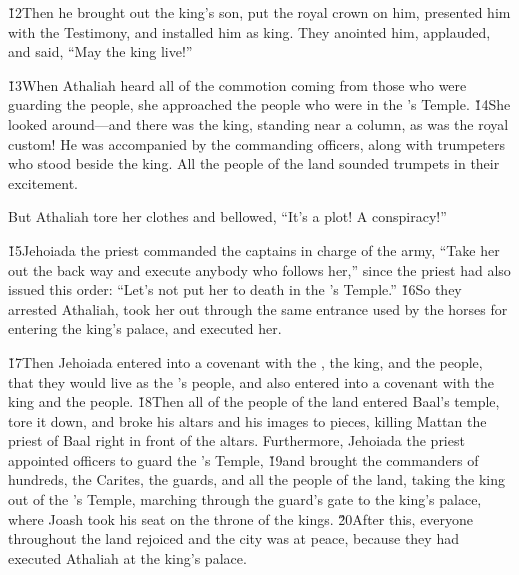 \v{12}Then he brought out the king's son, put the royal crown on him, presented him with the Testimony, and installed him as king. They anointed him, applauded, and said, ``May the king live!''

\v{13}When Athaliah heard all of the commotion coming from those who were guarding the people, she approached the people who were in the 's Temple. \v{14}She looked around---and there was the king, standing near a column, as was the royal custom! He was accompanied by the commanding officers, along with trumpeters who stood beside the king. All the people of the land sounded trumpets in their excitement.

But Athaliah tore her clothes and bellowed, ``It's a plot! A conspiracy!''

\v{15}Jehoiada the priest commanded the captains in charge of the army, ``Take her out the back way and execute anybody who follows her,'' since the priest had also issued this order: ``Let's not put her to death in the 's Temple.'' \v{16}So they arrested Athaliah, took her out through the same entrance used by the horses for entering the king's palace, and executed her.

\v{17}Then Jehoiada entered into a covenant with the , the king, and the people, that they would live as the 's people, and also entered into a covenant with the king and the people. \v{18}Then all of the people of the land entered Baal's temple, tore it down, and broke his altars and his images to pieces, killing Mattan the priest of Baal right in front of the altars. Furthermore, Jehoiada the priest appointed officers to guard the 's Temple, \v{19}and brought the commanders of hundreds, the Carites, the guards, and all the people of the land, taking the king out of the 's Temple, marching through the guard's gate to the king's palace, where Joash took his seat on the throne of the kings. \v{20}After this, everyone throughout the land rejoiced and the city was at peace, because they had executed Athaliah at the king's palace.

